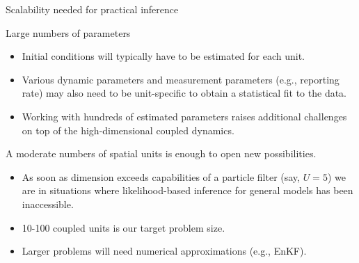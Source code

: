 \documentclass{beamer}
\begin{document}
\begin{frame}{Scalability needed for practical inference}

Large numbers of parameters
  \begin{itemize}
  \item  Initial conditions will typically have to be estimated for each unit.
  \item Various dynamic parameters and measurement parameters (e.g., reporting rate) may also need to be unit-specific to obtain a statistical fit to the data.
\item Working with hundreds of estimated parameters raises additional challenges on top of the high-dimensional coupled dynamics.
  \end{itemize}

\vspace{5mm}
  
A moderate numbers of spatial units is enough to open new possibilities.

  \begin{itemize}
  \item As soon as dimension exceeds capabilities of a particle filter (say, $U=5$) we are in situations where likelihood-based inference for general models has been inaccessible.

  \item 10-100 coupled units is our target problem size.

  \item Larger problems will need numerical approximations (e.g., EnKF).
        
  \end{itemize}

  \end{frame}
\end{document}
